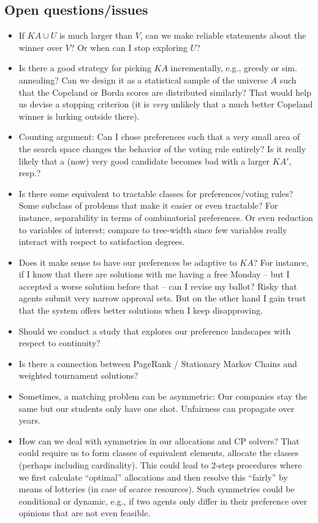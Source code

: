 \documentclass[10pt,a4paper,fleqn]{article}
\begin{document}
\subsection{Open questions/issues}

\begin{itemize}

\item If $\mathit{KA} \cup U$ is much larger than $V$, can we make reliable statements about the winner over $V$?
Or when can I stop exploring $U$?
\item Is there a good strategy for picking $\mathit{KA}$ incrementally, e.g., greedy or sim. annealing? Can we design 
it as a statistical sample of the universe $A$ such that the Copeland or Borda scores are distributed similarly? That 
would help us devise a stopping criterion (it is \emph{very} unlikely that a much better Copeland winner is lurking outside there).
\item Counting argument: Can I chose preferences such that a very small area of the search space changes the behavior
of the voting rule entirely? Is it really likely that a (now) very good candidate becomes bad with a larger $\mathit{KA}'$, resp.?
\item Is there some equivalent to tractable classes for preferences/voting rules? Some subclass of problems that make it easier or even 
tractable? For instance, separability in terms of combinatorial preferences. Or even reduction to variables of interest; compare to tree-width since
few variables really interact with respect to satisfaction degrees.
\item Does it make sense to have our preferences be adaptive to $\mathit{KA}$? For instance, if I know that there are solutions
with me having a free Monday -- but I accepted a worse solution before that -- can I revise my ballot? Risky that agents 
submit very narrow approval sets. But on the other hand I gain trust that the system offers better solutions when I keep disapproving.
\item Should we conduct a study that explores our preference landscapes with respect to continuity?
\item Is there a connection between PageRank / Stationary Markov Chains and weighted tournament solutions?
\item Sometimes, a matching problem can be asymmetric: Our companies stay the same but our students only have one shot. Unfairness can propagate over years.
\item How can we deal with symmetries in our allocations and CP solvers? That could require us to form classes of equivalent elements, allocate the classes (perhaps including cardinality). This could lead to 2-step procedures where we first calculate ``optimal'' allocations and then resolve this ``fairly'' by means of lotteries (in case of scarce resources). Such symmetries could be conditional or dynamic, e.g., if two agents only differ in their preference over opinions that are not even feasible. 
\end{itemize}
\end{document}
